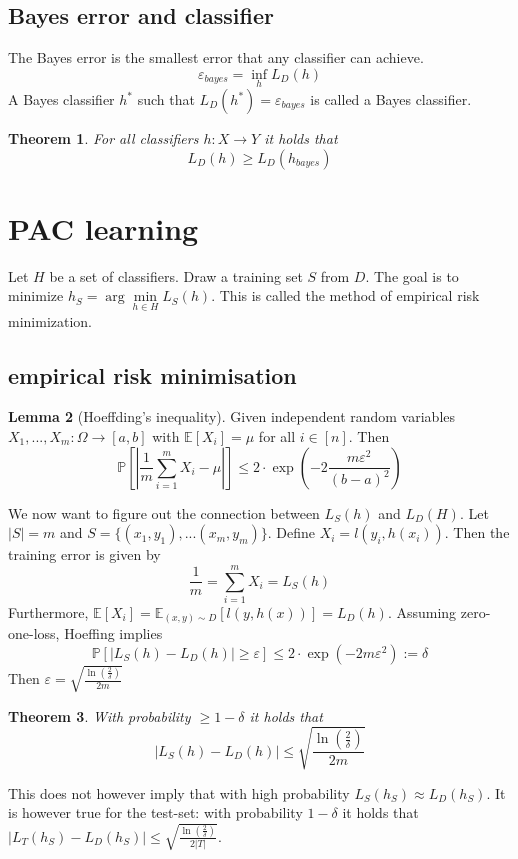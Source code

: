 \documentclass[a4paper, 12pt]{article}
\theoremstyle{plain}
\newtheorem{theorem}{Theorem}[subsection] %
\theoremstyle{definition}
\theoremstyle{lemma}
\newtheorem{lemma}[theorem]{Lemma}
\theoremstyle{remark}
\theoremstyle{example}
\begin{document}
	\subsection{Bayes error and classifier}
	The Bayes error is the smallest error that any classifier can achieve.
	\[\varepsilon_{bayes} = \inf\limits_{h} L_D(h)\] A Bayes classifier $h^*$ such that $L_D(h^*) = \varepsilon_{bayes}$ is called a Bayes classifier.
	\begin{theorem}
		For all classifiers $h: X \to Y$ it holds that \[L_D(h) \geq L_D(h_{bayes})\]
	\end{theorem}

	\section{PAC learning}
	Let $H$ be a set of classifiers. Draw a training set $S$ from $D$. The goal is to minimize $h_S = \arg\min\limits_{h \in H}L_S(h)$. This is called the method of empirical risk minimization.
	\subsection{empirical risk minimisation}
	\begin{lemma}[Hoeffding's inequality]
		Given independent random variables $X_1,...,X_m: \Omega \to [a,b]$ with $\mathbb{E}[X_i] = \mu$ for all $i\in[n]$.
		Then $$\mathbb{P}\left[\left|\frac{1}{m}\sum_{i=1}^m X_i-\mu\right|\right] \leq 2\cdot \exp\left(-2\frac{m\varepsilon^2}{(b-a)^2}\right)$$
	\end{lemma}
	We now want to figure out the connection between $L_S(h)$ and $L_D(H)$. Let $\left|S\right| = m$ and $S = \{(x_1,y_1), ... (x_m,y_m)\}$. Define $X_i = l(y_i,h(x_i))$. Then the training error is given by \[\frac{1}{m} = \sum_{i=1}^m X_i = L_S(h)\]
	Furthermore, $\mathbb{E}[X_i] = \mathbb{E}_{(x,y) \sim D}[l(y,h(x))] = L_D(h)$. Assuming zero-one-loss, Hoeffing implies \[\mathbb{P}[\left|L_S(h) - L_D(h)\right| \geq \varepsilon] \leq 2\cdot \exp(-2m\varepsilon^2) := \delta\]
	Then $\varepsilon = \sqrt{\frac{\ln(\frac{2}{\delta})}{2m}}$
	\begin{theorem}
		With probability $\geq 1-\delta$ it holds that \[\left|L_S(h) - L_D(h)\right| \leq \sqrt{\frac{\ln(\frac{2}{\delta})}{2m}}\]
	\end{theorem}
	This does not however imply that with high probability $L_S(h_S)\approx L_D(h_S)$. It is however true for the test-set: with probability $1-\delta$ it holds that $\left|L_T(h_S)-L_D(h_S)\right| \leq \sqrt{\frac{\ln(\frac{2}{\delta})}{2\left|T\right|}}$.
	
\end{document}
